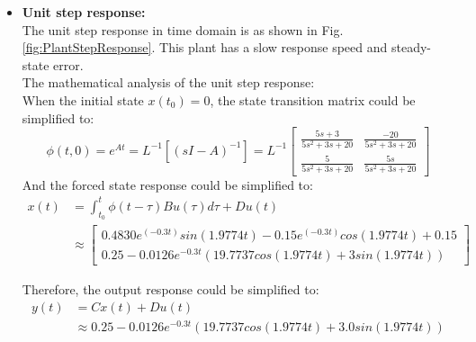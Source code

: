 \documentclass[12pt, oneside]{article}
\begin{document}
\begin{itemize}
    
    \item \textbf{Unit step response:} 
    \\The unit step response in time domain is as shown in Fig. \ref{fig:PlantStepResponse}. This plant has a slow response speed and steady-state error.
    \vspace{0.3cm}
    \\The mathematical analysis of the unit step response:
    \\When the initial state $x(t_0)=0$, the state transition matrix could be simplified to\cite{CourseMaterial}:
    \begin{equation}
        \phi(t,0)=e^{At}=L^{-1}[(sI-A)^{-1}]=L^{-1}
        \left[\begin{array}{ccc}\frac{5s+3}{5s^2+3s+20}&\frac{-20}{5s^2+3s+20}\\
        \frac{5}{5s^2+3s+20}&\frac{5s}{5s^2+3s+20}\end{array}\right]
    \end{equation}
    And the forced state response could be simplified to:
    \begin{equation}
    \begin{aligned}
        x(t)&=\int_{t_0}^t\phi(t-\tau)Bu(\tau)d\tau+Du(t)\\
        & \approx
        \left[
        \begin{array}{cc}
        0.4830e^{(-0.3t)}sin(1.9774t)-0.15e^{(-0.3t)}cos(1.9774t)+0.15  \\
             0.25-0.0126e^{-0.3t}(19.7737cos(1.9774t)+3sin(1.9774t)) 
        \end{array}
        \right]
    \end{aligned}
    \end{equation}

    Therefore, the output response could be simplified to:
    \begin{equation}
    \begin{aligned}
        y(t)&=Cx(t)+Du(t)\\
        & \approx
        0.25 - 0.0126e^{-0.3t}(19.7737cos(1.9774t) + 3.0sin(1.9774t))
    \end{aligned}
    \end{equation}
    



\end{itemize}
\end{document}

